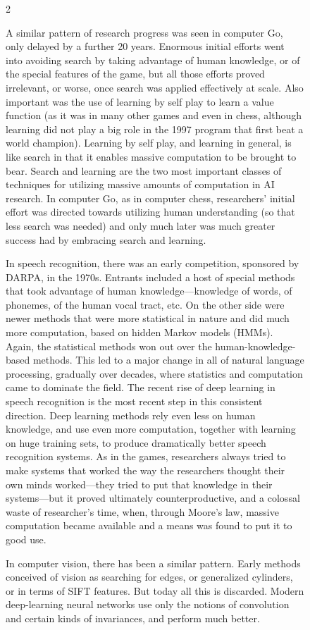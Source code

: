 \documentclass[10pt,conference]{IEEEtran}
\begin{document}
\begin{figure}[!t]
\begin{minipage}{0.94\textwidth}
\begin{multicols}{2}
{A similar pattern of research progress was seen in computer Go, only
delayed by a further 20 years. Enormous initial efforts went into
avoiding search by taking advantage of human knowledge, or of the
special features of the game, but all those efforts proved irrelevant,
or worse, once search was applied effectively at scale. Also important
was the use of learning by self play to learn a value function (as it
was in many other games and even in chess, although learning did not
play a big role in the 1997 program that first beat a world champion).
Learning by self play, and learning in general, is like search in that
it enables massive computation to be brought to bear. Search and
learning are the two most important classes of techniques for
utilizing massive amounts of computation in AI research. In computer
Go, as in computer chess, researchers' initial effort was directed
towards utilizing human understanding (so that less search was needed)
and only much later was much greater success had by embracing search
and learning.

In speech recognition, there was an early competition, sponsored by
DARPA, in the 1970s. Entrants included a host of special methods that
took advantage of human knowledge---knowledge of words, of phonemes,
of the human vocal tract, etc. On the other side were newer methods
that were more statistical in nature and did much more computation,
based on hidden Markov models (HMMs). Again, the statistical methods
won out over the human-knowledge-based methods. This led to a major
change in all of natural language processing, gradually over decades,
where statistics and computation came to dominate the field. The
recent rise of deep learning in speech recognition is the most recent
step in this consistent direction. Deep learning methods rely even
less on human knowledge, and use even more computation, together with
learning on huge training sets, to produce dramatically better speech
recognition systems. As in the games, researchers always tried to make
systems that worked the way the researchers thought their own minds
worked---they tried to put that knowledge in their systems---but it
proved ultimately counterproductive, and a colossal waste of
researcher's time, when, through Moore's law, massive computation
became available and a means was found to put it to good use.

In computer vision, there has been a similar pattern. Early methods
conceived of vision as searching for edges, or generalized cylinders,
or in terms of SIFT features. But today all this is discarded. Modern
deep-learning neural networks use only the notions of convolution and
certain kinds of invariances, and perform much better.
}


\end{multicols}
\end{minipage}
\end{figure}
\end{document}
